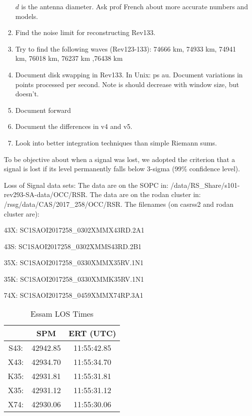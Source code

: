 \documentclass[crop=false,class=article,oneside]{standalone}
\begin{document}
\begin{enumerate}
                  $d$ is the antenna diameter. Ask prof French about
                  more accurate numbers and models.
            \item Find the noise limit for reconstructing Rev133.
            \item Try to find the following waves (Rev123-133):
                  74666 km, 74933 km, 74941 km, 76018 km,
                  76237 km ,76438 km
            \item Document disk swapping in Rev133. In Unix: ps au.
                  Document variations in points processed per second.
                  Note is should decrease with window size, but
                  doesn't.
            \item Document forward
            \item Document the differences in v4 and v5.
            \item Look into better integration techniques than simple
                  Riemann sums.
        \end{enumerate}
To be objective about when a signal was lost, we adopted the criterion that a signal is lost if its level permanently falls below 3-sigma (99\% confidence level).
\par
Loss of Signal data sets:
The data are on the SOPC in:
/data/RS\_Share/s101-rev293-SA-data/OCC/RSR. The data are on the rodan cluster in: /rssg/data/CAS/2017\_258/OCC/RSR. The filenames (on casrss2 and rodan cluster are):
\begin{itemize}
\begin{multicols}{2}
    \item 43X: SC1SAOI2017258\_0302XMMX43RD.2A1
    \item 43S: SC1SAOI2017258\_0302XMMS43RD.2B1
    \item 35X: SC1SAOI2017258\_0330XMMX35RV.1N1
    \item 35K: SC1SAOI2017258\_0330XMMK35RV.1N1
    \item 74X: SC1SAOI2017258\_0459XMMX74RP.3A1
\end{multicols}
\end{itemize}
\begin{table}[H]
    \centering
    \caption{Essam LOS Times}
    \begin{tabular}{c c c} 
        \hline
         & SPM      & ERT (UTC)    \\ 
        \hline
        S43: & 42942.85 & 11:55:42.85  \\
        X43: & 42934.70 & 11:55:34.70  \\
        K35: & 42931.81 & 11:55:31.81  \\
        X35: & 42931.12 & 11:55:31.12  \\
        X74: & 42930.06 & 11:55:30.06  \\
        \hline
    \end{tabular}
\end{table}
\end{document}
